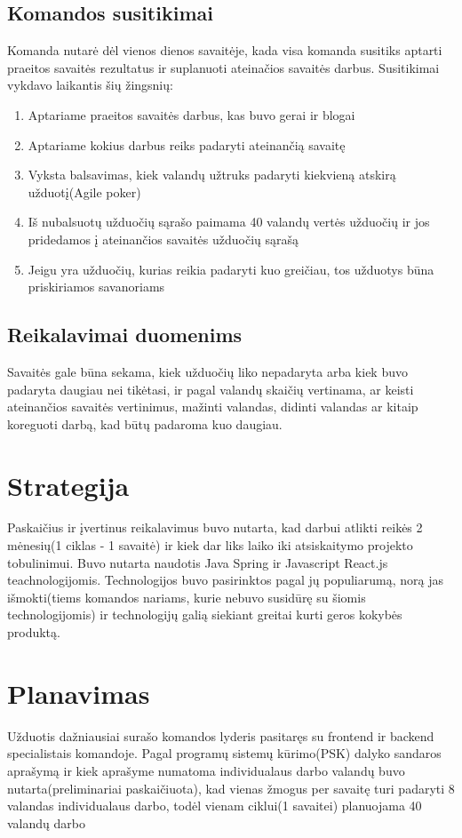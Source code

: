 \documentclass{VUMIFInfKursinis}
\begin{document}
	\subsection{Komandos susitikimai}
	Komanda nutarė dėl vienos dienos savaitėje, kada visa komanda susitiks aptarti praeitos savaitės rezultatus ir suplanuoti ateinačios savaitės darbus. Susitikimai vykdavo laikantis šių žingsnių:
		\begin{enumerate}
			\item{Aptariame praeitos savaitės darbus, kas buvo gerai ir blogai}
			\item{Aptariame kokius darbus reiks padaryti ateinančią savaitę}
			\item{Vyksta balsavimas, kiek valandų užtruks padaryti kiekvieną atskirą užduotį(Agile poker)}
			\item{Iš nubalsuotų užduočių sąrašo paimama 40 valandų vertės užduočių ir jos pridedamos į ateinančios savaitės užduočių sąrašą}
			\item{Jeigu yra užduočių, kurias reikia padaryti kuo greičiau, tos užduotys būna priskiriamos savanoriams}
		\end{enumerate}
	\subsection{Reikalavimai duomenims}
	Savaitės gale būna sekama, kiek užduočių liko nepadaryta arba kiek buvo padaryta daugiau nei tikėtasi, ir pagal valandų skaičių vertinama, ar keisti ateinančios savaitės vertinimus, mažinti valandas, didinti valandas ar kitaip koreguoti darbą, kad būtų padaroma kuo daugiau.
\section{Strategija}
Paskaičius ir įvertinus reikalavimus buvo nutarta, kad darbui atlikti reikės 2 mėnesių(1 ciklas - 1 savaitė) ir kiek dar liks laiko iki atsiskaitymo projekto tobulinimui. Buvo nutarta naudotis Java Spring ir Javascript React.js teachnologijomis. Technologijos buvo pasirinktos pagal jų populiarumą, norą jas išmokti(tiems komandos nariams, kurie nebuvo susidūrę su šiomis technologijomis) ir technologijų galią siekiant greitai kurti geros kokybės produktą.
\section{Planavimas} 
Užduotis dažniausiai surašo komandos lyderis pasitaręs su frontend ir backend specialistais komandoje. Pagal programų sistemų kūrimo(PSK) dalyko sandaros aprašymą ir kiek aprašyme numatoma individualaus darbo valandų buvo nutarta(preliminariai paskaičiuota), kad vienas žmogus per savaitę turi padaryti 8 valandas individualaus darbo, todėl vienam ciklui(1 savaitei) planuojama 40 valandų darbo
\end{document}
